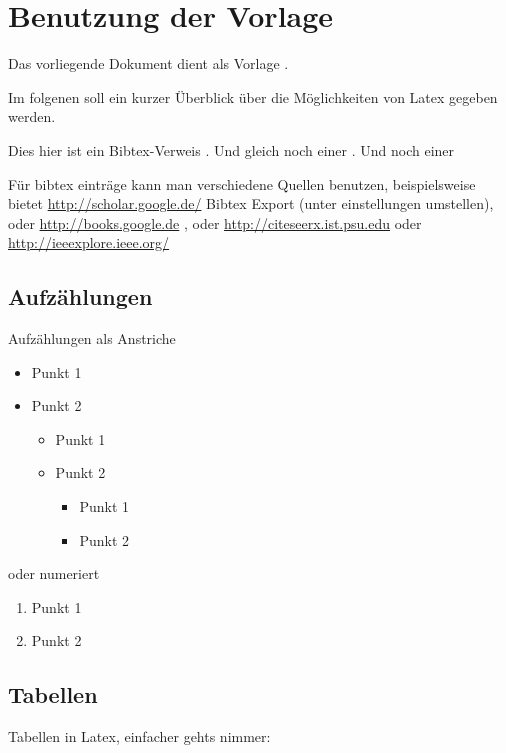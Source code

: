 \chapter{Benutzung der Vorlage}

Das vorliegende Dokument dient als Vorlage .

Im folgenen soll ein kurzer Überblick über die Möglichkeiten von Latex gegeben werden.

Dies hier ist ein Bibtex-Verweis \cite{sparqlAlgebra}.
Und gleich noch einer \cite{coresparql}. Und noch einer \cite[Kapitel X, Seit XY ff]{sparqlAlgebra}

Für bibtex einträge kann man verschiedene Quellen benutzen,
beispielsweise bietet
\url{http://scholar.google.de/} Bibtex Export (unter einstellungen umstellen),
oder \url{http://books.google.de} , oder \url{http://citeseerx.ist.psu.edu}
oder \url{http://ieeexplore.ieee.org/}

\section{Aufzählungen}

Aufzählungen als Anstriche
\begin{itemize}
    \item Punkt 1
    \item Punkt 2
        \begin{itemize}
            \item Punkt 1
            \item Punkt 2
                \begin{itemize}
                    \item Punkt 1
                    \item Punkt 2
                \end{itemize}
        \end{itemize}
\end{itemize}

oder numeriert
\begin{enumerate}
    \item Punkt 1
    \item Punkt 2
\end{enumerate}

\section{Tabellen}

Tabellen in Latex, einfacher gehts nimmer:

